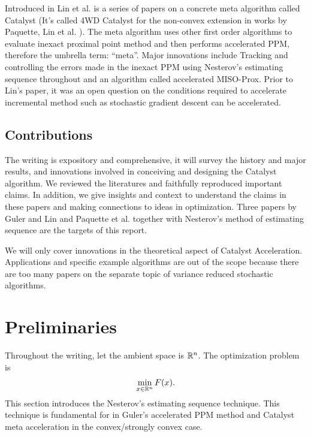 \documentclass[12pt]{article}
\begin{document}
    Introduced in Lin et al. \cite{lin_universal_2015,lin_catalyst_2018} is a series of papers on a concrete meta algorithm called Catalyst (It's called 4WD Catalyst for the non-convex extension in works by Paquette, Lin et al. \cite{paquette_catalyst_2018}). 
    The meta algorithm uses other first order algorithms to evaluate inexact proximal point method and then performs accelerated PPM, therefore the umbrella term: ``meta''. 
    Major innovations include Tracking and controlling the errors made in the inexact PPM using Nesterov's estimating sequence throughout and an algorithm called accelerated MISO-Prox.  
    Prior to Lin's paper, it was an open question on the conditions required to accelerate incremental method such as stochastic gradient descent can be accelerated. 

    \subsection{Contributions}
        The writing is expository and comprehensive, it will survey the history and major results, and innovations involved in conceiving and designing the Catalyst algorithm. 
        We reviewed the literatures and faithfully reproduced important claims.
        In addition, we give insights and context to understand the claims in these papers and making connections to ideas in optimization. 
        Three papers by Guler \cite{guler_new_1992} and Lin \cite{lin_universal_2015} and Paquette et al. \cite{lin_catalyst_2018} together with Nesterov's \cite{nesterov_lectures_2018} method of estimating sequence are the targets of this report. 

        We will only cover innovations in the theoretical aspect of Catalyst Acceleration. 
        Applications and specific example algorithms are out of the scope because there are too many papers on the separate topic of variance reduced stochastic algorithms. 

\section{Preliminaries}\label{sec:preliminaries}
    Throughout the writing, let the ambient space is $\mathbb R^n$. 
    The optimization problem is
    \begin{align*}
        \min_{x \in \mathbb R^n} F(x). 
    \end{align*}
    This section introduces the Nesterov's estimating sequence technique. 
    This technique is fundamental for in Guler's accelerated PPM method and Catalyst meta acceleration in the convex/strongly convex case. 
\end{document}
